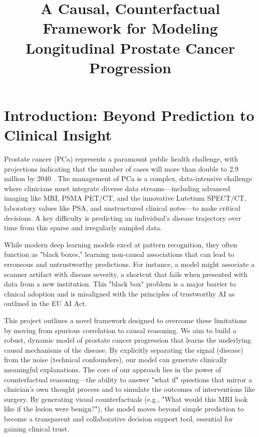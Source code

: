 \documentclass[11pt, a4paper]{article}
\title{A Causal, Counterfactual Framework for Modeling Longitudinal Prostate Cancer Progression}
\author{}
\date{}
\begin{document}
\maketitle

\section{Introduction: Beyond Prediction to Clinical Insight}
Prostate cancer (PCa) represents a paramount public health challenge, with projections indicating that the number of cases will more than double to 2.9 million by 2040 \cite{SungFerlay2021}. The management of PCa is a complex, data-intensive challenge where clinicians must integrate diverse data streams—including advanced imaging like MRI, PSMA PET/CT, and the innovative Lutetium SPECT/CT, laboratory values like PSA, and unstructured clinical notes—to make critical decisions. A key difficulty is predicting an individual's disease trajectory over time from this sparse and irregularly sampled data.

While modern deep learning models excel at pattern recognition, they often function as "black boxes," learning non-causal associations that can lead to erroneous and untrustworthy predictions. For instance, a model might associate a scanner artifact with disease severity, a shortcut that fails when presented with data from a new institution. This "black box" problem is a major barrier to clinical adoption and is misaligned with the principles of trustworthy AI as outlined in the EU AI Act.

This project outlines a novel framework designed to overcome these limitations by moving from spurious correlation to causal reasoning. We aim to build a robust, dynamic model of prostate cancer progression that learns the underlying causal mechanisms of the disease. By explicitly separating the signal (disease) from the noise (technical confounders), our model can generate clinically meaningful explanations. The core of our approach lies in the power of counterfactual reasoning—the ability to answer "what if" questions that mirror a clinician's own thought process and to simulate the outcomes of interventions like surgery. By generating visual counterfactuals (e.g., "What would this MRI look like if the lesion were benign?"), the model moves beyond simple prediction to become a transparent and collaborative decision support tool, essential for gaining clinical trust.
\end{document}
